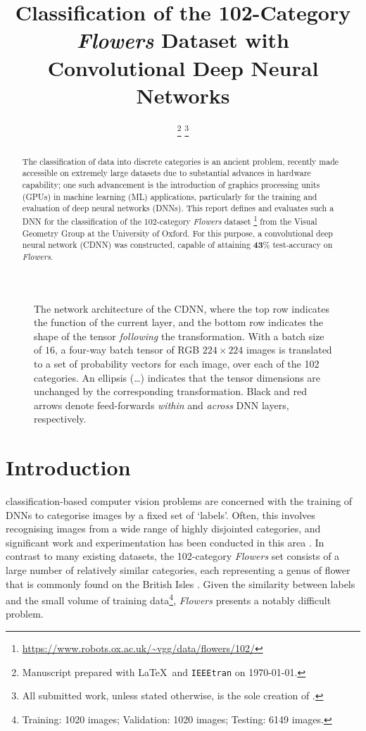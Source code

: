 \documentclass[journal]{IEEEtran}
\title{Classification of the 102-Category \emph{Flowers} Dataset with
    Convolutional Deep Neural Networks}
\author{\candidate%
    \thanks{Manuscript prepared with \LaTeX\ and \texttt{IEEEtran} on \today.}%
    \thanks{All submitted work, unless stated otherwise, is the sole creation
    of \candidate.}}
\newcommand\networkperformance{43}
\begin{document}
\maketitle
\begin{figure*}[t]
    \caption{The network architecture of the CDNN, where the top row indicates
    the function of the current layer, and the bottom row indicates the shape of
    the tensor \emph{following} the transformation. With a batch size of $16$, a
    four-way batch tensor of RGB $224 \times 224$ images is translated to a set
    of probability vectors for each image, over each of the 102 categories. An
    ellipsis (\ldots) indicates that the tensor dimensions are unchanged by the
    corresponding transformation. Black and red arrows denote feed-forwards
    \emph{within} and \emph{across} DNN layers, respectively.}%
    \label{fig:network-architecture}
\end{figure*}
\begin{abstract}
    The classification of data into discrete categories is an ancient problem,
    recently made accessible on extremely large datasets due to substantial
    advances in hardware capability; one such advancement is the introduction of
    graphics processing units (GPUs) in machine learning (ML) applications,
    particularly for the training and evaluation of deep neural networks (DNNs).
    This report defines and evaluates such a DNN for the classification of the
    102-category \emph{Flowers} dataset%
    \footnote{\url{https://www.robots.ox.ac.uk/~vgg/data/flowers/102/}} from the
    Visual Geometry Group at the University of Oxford.  For this purpose, a
    convolutional deep neural network (CDNN) was constructed, capable of
    attaining $\mathbf{\networkperformance}$\% test-accuracy on \emph{Flowers}.
\end{abstract}
\section{Introduction}
 classification-based computer vision problems are
concerned with the training of DNNs to categorise images by a fixed set of
`labels'. Often, this involves recognising images from a wide range of highly
disjointed categories, and significant work and experimentation has been
conducted in this area \cite{Chen:2021}. In contrast to many existing datasets,
the 102-category \emph{Flowers} set consists of a large number of relatively
similar categories, each representing a genus of flower that is commonly found
on the British Isles \cite{Nilsback:2008}. Given the similarity between labels
and the small volume of training data\footnote{Training: 1020 images;
Validation: 1020 images; Testing: 6149 images.}, \emph{Flowers} presents a
notably difficult problem.
\end{document}
